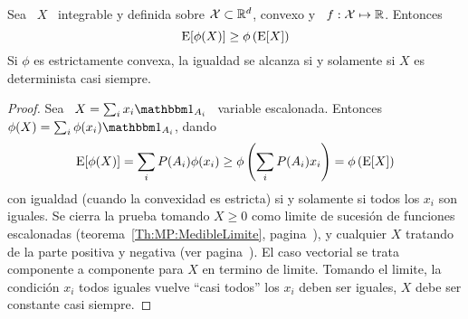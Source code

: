 {\begin{teorema}
  Sea \ $X$ \ integrable y definida  sobre $\mathcal{X} \subset \mathbb{R}^d$, convexo y \ $f:
  \mathcal{X} \mapsto \mathbb{R}$. Entonces
  \[
  \operatorname{E}[\phi(X)] \ge \phi\left( \operatorname{E}[X] \right)
  \]
  Si $\phi$ es  estrictamente convexa, la igualdad se alcanza  si y solamente si
  $X$ es determinista casi siempre.
\end{teorema}
%
\begin{proof}
  Sea \ $X = \sum_i x_i  \un_{A_i}$ \ variable escalonada. Entonces \ $\phi(X) =
  \sum_i \phi(x_i) \un_{A_i}$, dando
  \[
  \operatorname{E}[\phi(X)]  = \sum_i  P(A_i)  \phi(x_i) \ge  \phi\left(  \sum_i P(A_i)  x_i
  \right) = \phi\left( \operatorname{E}[X] \right)
  \]
  con igualdad  (cuando la convexidad es  estricta) si y solamente  si todos los
  $x_i$  son iguales.  Se  cierra la  prueba tomando  $X \ge  0$ como  limite de
  sucesi\'on   de   funciones  escalonadas   (teorema~\ref{Th:MP:MedibleLimite},
  pagina~\pageref{Th:MP:MedibleLimite}),  y cualquier $X$  tratando de  la parte
  positiva  y  negativa  (ver  pagina~\pageref{Th:MP:MedibleLimite}).   El  caso
  vectorial  se   trata  componente  a   componente  para  $X$  en   termino  de
  limite. Tomando  el limite, la  condici\'on $x_i$ todos iguales  vuelve ``casi
  todos'' los $x_i$ deben ser iguales, \ie $X$ debe ser constante casi siempre.
\end{proof}

}
